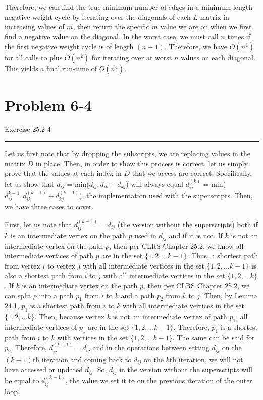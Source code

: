 \documentclass[11pt]{article}
\def\separateline{\medskip\hrule\medskip}
\begin{document}
Therefore, we can find the true minimum number of edges in a minimum length negative weight cycle by iterating over the diagonals of each $L$ matrix in increasing values of $m$, then return the specific $m$ value we are on when we first find a negative value on the diagonal. In the worst case, we must call  $n$ times if the first negative weight cycle is of length $(n-1)$. Therefore, we have $O(n^4)$ for all calls to  plus $O(n^2)$ for iterating over at worst $n$ values on each diagonal. This yields a final run-time of $O(n^4)$.

\newpage


\section{Problem 6-4}
Exercise 25.2-4
\separateline

Let us first note that by dropping the subscripts, we are replacing values in the matrix $D$ in place. Then, in order to show this process is correct, let us simply prove that the values at each index in $D$ that we access are correct. Specifically, let us show that $d_{ij}$ = min($d_{ij}, d_{ik} + d_{kj}$) will always equal $d_{ij}^{(k)}$ = min($d_{ij}^{k-1}, d_{ik}^{(k-1)} + d_{kj}^{(k-1)}$), the implementation used with the superscripts. Then, we have three cases to cover.

First, let us note that $d_{ij}^{(k-1)} = d_{ij}$ (the version without the superscripts) both if $k$ is an intermediate vertex on the path $p$ used in $d_{ij}$ and if it is not. If $k$ is not an intermediate vertex on the path $p$, then per CLRS Chapter 25.2, we know all intermediate vertices of path $p$ are in the set $\{1,2,...k-1\}$. Thus, a shortest path from vertex $i$ to vertex $j$ with all intermediate vertices in the set $\{1,2,...k-1\}$ is also a shortest path from $i$ to $j$ with all intermediate vertices in the set $\{1,2,...k\}$. If $k$ is an intermediate vertex on the path $p$, then per CLRS Chapter 25.2, we can split $p$ into a path $p_1$ from $i$ to $k$ and a path $p_2$ from $k$ to $j$. Then, by Lemma 24.1, $p_1$ is a shortest path from $i$ to $k$ with all intermediate vertices in the set $\{1,2,...k\}$. Then, because vertex $k$ is not an intermediate vertex of path $p_1$, all intermediate vertices of $p_1$ are in the set $\{1,2,...k-1\}$. Therefore, $p_1$ is a shortest path from $i$ to $k$ with vertices in the set $\{1,2,...k-1\}$. The same can be said for $p_2$. Therefore, $d_{ij}^{(k-1)} = d_{ij}$ and in the operations between setting $d_{ij}$ on the $(k-1)$th iteration and coming back to $d_{ij}$ on the $k$th iteration, we will not have accessed or updated $d_{ij}$. So, $d_{ij}$ in the version without the superscripts will be equal to $d_{ij}^{(k-1)}$, the value we set it to on the previous iteration of the outer loop.
\end{document}
